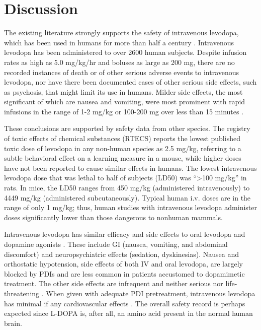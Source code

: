 \section{Discussion}
The existing literature strongly supports the safety of intravenous levodopa, which has been used in humans for more than half a century \cite{14430381}.  Intravenous levodopa has been administered to over 2600 human subjects.  Despite infusion rates as high as 5.0 mg/kg/hr and boluses as large as 200 mg, there are no recorded instances of death or of other serious adverse events to intravenous levodopa, nor have there been documented cases of other serious side effects, such as psychosis, that might limit its use in humans. Milder side effects, the most significant of which are nausea and vomiting, were most prominent with rapid infusions in the range of 1-2 mg/kg or 100-200 mg over less than 15 minutes \cite{5327616,Bbrung_1966,12865145,4555619,6540399,4880674}. 

These conclusions are supported by safety data from other species. The registry of toxic effects of chemical substances (RTECS) reports the lowest published toxic dose of levodopa in any non-human species as 2.5 mg/kg, referring to a subtle behavioral effect on a learning measure in a mouse, while higher doses have not been reported to cause similar effects in humans.  The lowest intravenous levodopa dose that was lethal to half of subjects (LD50) was ``>100 mg/kg'' in rats.  In mice, the LD50 ranges from 450 mg/kg (administered intravenously) to 4449 mg/kg (administered subcutaneously)\cite{rtecs}.  Typical human i.v. doses are in the range of only 1 mg/kg; thus, human studies with intravenous levodopa administer doses significantly lower than those dangerous to nonhuman mammals. 

Intravenous levodopa has similar efficacy and side effects to oral levodopa \cite{Connolly_2014} and dopamine agonists \cite{Bonuccelli_2008}.  These include GI (nausea, vomiting, and abdominal discomfort) and neuropsychiatric effects (sedation, dyskinesias).  Nausea and orthostatic hypotension, side effects of both IV and oral levodopa, are largely blocked by PDIs and are less common in patients accustomed to dopamimetic treatment.  The other side effects are infrequent and neither serious nor life-threatening \cite{Connolly_2014}. When given with adequate PDI pretreatment, intravenous levodopa has minimal if any cardiovascular effects \cite{Siddiqi2015}. The overall safety record is perhaps expected since L-DOPA is, after all, an amino acid present in the normal human brain. 

